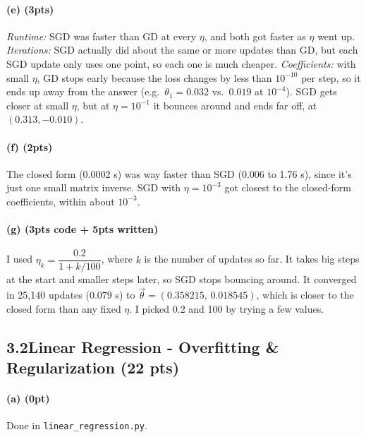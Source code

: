 \documentclass[11pt]{article}
\newcommand{\vth}{\vec\theta}
\begin{document}
\paragraph{(e) (3pts)}
\emph{Runtime:} SGD was faster than GD at every $\eta$, and both got faster as $\eta$ went up.
\emph{Iterations:} SGD actually did about the same or more updates than GD, but each SGD update only uses one point, so each one is much cheaper.
\emph{Coefficients:} with small $\eta$, GD stops early because the loss changes by less than $10^{-10}$ per step, so it ends up away from the answer (e.g.\ $\theta_1=0.032$ vs.\ $0.019$ at $10^{-4}$). SGD gets closer at small $\eta$, but at $\eta=10^{-1}$ it bounces around and ends far off, at $(0.313,-0.010)$.

\paragraph{(f) (2pts)} The closed form (0.0002 s) was way faster than SGD (0.006 to 1.76 s), since it's just one small matrix inverse. SGD with $\eta=10^{-3}$ got closest to the closed-form coefficients, within about $10^{-3}$.

\paragraph{(g) (3pts code + 5pts written)} I used $\eta_k=\dfrac{0.2}{1+k/100}$, where $k$ is the number of updates so far. It takes big steps at the start and smaller steps later, so SGD stops bouncing around. It converged in 25{,}140 updates (0.079 s) to $\vth=(0.358215,\,0.018545)$, which is closer to the closed form than any fixed $\eta$. I picked 0.2 and 100 by trying a few values.

\subsection*{3.2\quad Linear Regression - Overfitting \& Regularization (22 pts)}

\paragraph{(a) (0pt)} Done in \texttt{linear\_regression.py}.
\end{document}

